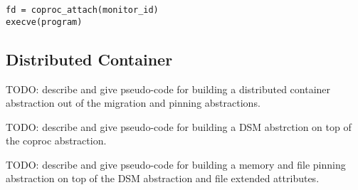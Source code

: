 
\begin{lstlisting}[frame=single,caption={Launching a program under a monitor},captionpos=b]
fd = coproc_attach(monitor_id)
execve(program)
\end{lstlisting}








\subsection{Distributed Container}

TODO: describe and give pseudo-code for building a distributed container
abstraction out of the migration and pinning abstractions.




TODO: describe and give pseudo-code for building a DSM abstrction on top of the
coproc abstraction.



TODO: describe and give pseudo-code for building a memory and file pinning
abstraction on top of the DSM abstraction and file extended attributes.


